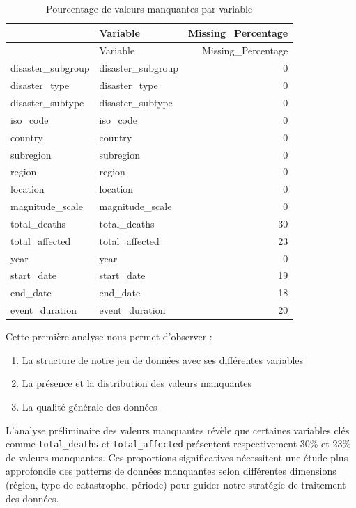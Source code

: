 \documentclass[
]{article}
\begin{document}
\begin{longtable}[]{@{}llr@{}}
\caption{Pourcentage de valeurs manquantes par variable}\tabularnewline
\toprule\noalign{}
& Variable & Missing\_Percentage \\
\midrule\noalign{}
\endfirsthead
\toprule\noalign{}
& Variable & Missing\_Percentage \\
\midrule\noalign{}
\endhead
\bottomrule\noalign{}
\endlastfoot
disaster\_subgroup & disaster\_subgroup & 0 \\
disaster\_type & disaster\_type & 0 \\
disaster\_subtype & disaster\_subtype & 0 \\
iso\_code & iso\_code & 0 \\
country & country & 0 \\
subregion & subregion & 0 \\
region & region & 0 \\
location & location & 0 \\
magnitude\_scale & magnitude\_scale & 0 \\
total\_deaths & total\_deaths & 30 \\
total\_affected & total\_affected & 23 \\
year & year & 0 \\
start\_date & start\_date & 19 \\
end\_date & end\_date & 18 \\
event\_duration & event\_duration & 20 \\
\end{longtable}

Cette première analyse nous permet d'observer :

\begin{enumerate}
\def\labelenumi{\arabic{enumi}.}
\item
  La structure de notre jeu de données avec ses différentes variables
\item
  La présence et la distribution des valeurs manquantes
\item
  La qualité générale des données
\end{enumerate}

L'analyse préliminaire des valeurs manquantes révèle que certaines
variables clés comme \texttt{total\_deaths} et \texttt{total\_affected}
présentent respectivement 30\% et 23\% de valeurs manquantes. Ces
proportions significatives nécessitent une étude plus approfondie des
patterns de données manquantes selon différentes dimensions (région,
type de catastrophe, période) pour guider notre stratégie de traitement
des données.
\end{document}
